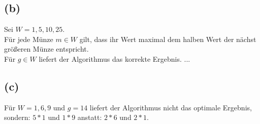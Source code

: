 \subsection*{(b)}

Sei $W = {1,5,10,25}$.\\
Für jede Münze $m \in W$ gilt, dass ihr Wert maximal dem halben Wert der nächst größeren Münze entspricht.\\ 
Für $g \in W$ liefert der Algorithmus das korrekte Ergebnis.
...


\subsection*{(c)}

Für $W = {1,6,9}$ und $g = 14$ liefert der Algorithmus nicht das optimale Ergebnis, sondern: $5 * 1$ und $1 * 9$ anstatt: $2 * 6$ und $2 * 1$.


